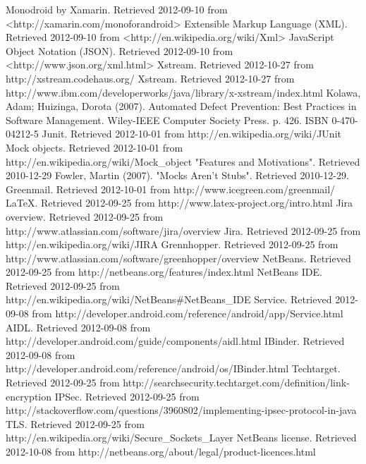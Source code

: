 \documentclass[12pt]{report}
\begin{document}
\begin{thebibliography}{99}
 Monodroid by Xamarin. Retrieved 2012-09-10 from <http://xamarin.com/monoforandroid>
 Extensible Markup Language (XML). Retrieved 2012-09-10 from <http://en.wikipedia.org/wiki/Xml>
 JavaScript Object Notation (JSON). Retrieved 2012-09-10 from <http://www.json.org/xml.html>
 Xstream. Retrieved 2012-10-27 from http://xstream.codehaus.org/
 Xstream. Retrieved 2012-10-27 from http://www.ibm.com/developerworks/java/library/x-xstream/index.html
 Kolawa, Adam; Huizinga, Dorota (2007). Automated Defect Prevention: Best Practices in Software Management. Wiley-IEEE Computer Society Press. p. 426. ISBN 0-470-04212-5
 Junit. Retrieved 2012-10-01 from http://en.wikipedia.org/wiki/JUnit
 Mock objects. Retrieved 2012-10-01 from http://en.wikipedia.org/wiki/Mock\_object
 "Features and Motivations". Retrieved 2010-12-29
 Fowler, Martin (2007). "Mocks Aren't Stubs". Retrieved 2010-12-29.
 Greenmail. Retrieved 2012-10-01 from http://www.icegreen.com/greenmail/
 LaTeX. Retrieved 2012-09-25 from http://www.latex-project.org/intro.html
 Jira overview. Retrieved 2012-09-25 from http://www.atlassian.com/software/jira/overview
 Jira. Retrieved 2012-09-25 from http://en.wikipedia.org/wiki/JIRA
 Grennhopper. Retrieved 2012-09-25 from http://www.atlassian.com/software/greenhopper/overview
 NetBeans. Retrieved 2012-09-25 from http://netbeans.org/features/index.html
 NetBeans IDE. Retrieved 2012-09-25 from http://en.wikipedia.org/wiki/NetBeans\#NetBeans\_IDE
 Service. Retrieved 2012-09-08 from http://developer.android.com/reference/android/app/Service.html
 AIDL. Retrieved 2012-09-08 from http://developer.android.com/guide/components/aidl.html
 IBinder. Retrieved 2012-09-08 from http://developer.android.com/reference/android/os/IBinder.html
 Techtarget. Retrieved 2012-09-25 from http://searchsecurity.techtarget.com/definition/link-encryption
 IPSec. Retrieved 2012-09-25 from http://stackoverflow.com/questions/3960802/implementing-ipsec-protocol-in-java
 TLS. Retrieved 2012-09-25 from http://en.wikipedia.org/wiki/Secure\_Sockets\_Layer
 NetBeans license. Retrieved 2012-10-08 from http://netbeans.org/about/legal/product-licences.html

\end{thebibliography}
\end{document}
